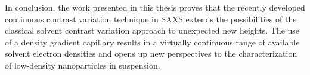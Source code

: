 In conclusion, the work presented in this thesis proves that the recently developed continuous contrast variation technique in SAXS extends the possibilities of the classical solvent contrast variation approach to unexpected new heights. The use of a density gradient capillary results in a virtually continuous range of available solvent electron densities and opens up new perspectives to the characterization of low-density nanoparticles in suspension.
